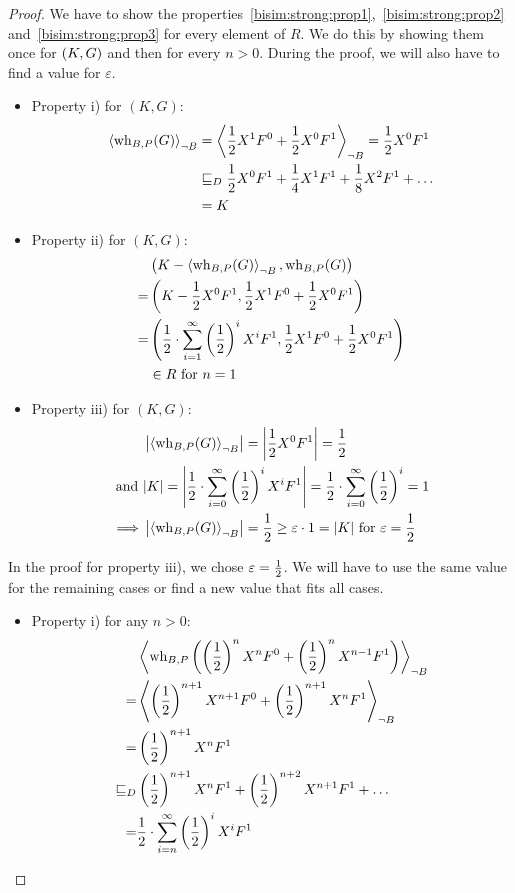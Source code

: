 \begin{proof}
	We have to show the properties~\ref{bisim:strong:prop1},~\ref{bisim:strong:prop2} and~\ref{bisim:strong:prop3} for every element of $R$.
	We do this by showing them once for $\left( K, G \right)$ and then for every $n > 0$.
	During the proof, we will also have to find a value for $\varepsilon$.
	\begin{itemize}
		\item Property i) for $(K, G)$:
			\begin{align*}
				\left\langle  \operatorname{wh}_{B, P}(G)  \right\rangle_{\lnot B} & = \left\langle  \frac{1}{2} X^1 F^0 + \frac{1}{2} X^0 F^1 \right\rangle_{\lnot B} = \frac{1}{2} X^0 F^1 \\
				& \sqsubseteq_{D} \frac{1}{2} X^0 F^1 + \frac{1}{4} X^1 F^1 + \frac{1}{8} X^2 F^1 + \ldots \\
				&= K
			\end{align*}
		\item Property ii) for $(K, G)$:
			\begin{align*}
				 & \left( K - \left\langle  \operatorname{wh}_{B, P}(G)  \right\rangle_{\lnot B}, \operatorname{wh}_{B, P}(G) \right) \\
				=& \left( K - \frac{1}{2} X^0 F^1, \frac{1}{2} X^1 F^0 + \frac{1}{2} X^0 F^1 \right) \\
				=& \left(  \frac{1}{2} \cdot \sum_{i=1}^{\infty} \left( \frac{1}{2} \right)^i X^i F^1,
					\frac{1}{2} X^1 F^0 + \frac{1}{2} X^0 F^1 \right) \\
				& \in R \text{ for } n = 1
			\end{align*}
		\item Property iii) for $(K, G)$:
			\begin{align*}
				& \left| \left\langle  \operatorname{wh}_{B, P}(G)  \right\rangle_{\lnot B} \right| = \left| \frac{1}{2} X^0 F^1 \right| = \frac{1}{2} \\
				\text{and } & |K| = \left| \frac{1}{2} \cdot \sum_{i=0}^\infty \left( \frac{1}{2} \right)^i X^{i} F^1 \right|
					= \frac{1}{2} \cdot \sum_{i=0}^\infty \left( \frac{1}{2} \right)^i = 1 \\
				\implies & \left| \left\langle  \operatorname{wh}_{B, P}(G)  \right\rangle_{\lnot B} \right| = \frac{1}{2} \geq \varepsilon \cdot 1 = |K|
					\text{ for } \varepsilon = \frac{1}{2}
			\end{align*}
	\end{itemize}
	In the proof for property iii), we chose $\varepsilon = \frac{1}{2}$.
	We will have to use the same value for the remaining cases or find a new value that fits all cases.
	\begin{itemize}
		\item Property i) for any $n > 0$:
			\begin{align*}
				& \left\langle  \operatorname{wh}_{B, P}\left( \left( \frac{1}{2} \right)^n X^n F^0 + \left( \frac{1}{2} \right)^n X^{n-1} F^1 \right)  \right\rangle_{\lnot B} \\
				=&  \left\langle  \left( \frac{1}{2} \right)^{n+1} X^{n+1} F^0 + \left( \frac{1}{2} \right)^{n+1} X^n F^1  \right\rangle_{\lnot B} \\
				=& \left( \frac{1}{2} \right)^{n+1} X^n F^1 \\
				\sqsubseteq_{D}& \left( \frac{1}{2} \right)^{n+1} X^n F^1 + \left( \frac{1}{2} \right)^{n+2} X^{n+1} F^1 + \ldots \\
				=& \frac{1}{2} \cdot \sum_{i=n}^{\infty} \left( \frac{1}{2} \right)^i X^i F^1
			\end{align*}
		

\end{itemize}
\end{proof}
